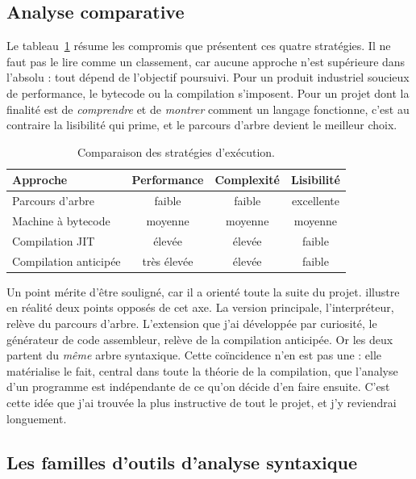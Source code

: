 \subsection{Analyse comparative}

Le tableau~\ref{tab:approches} résume les compromis que présentent ces quatre
stratégies. Il ne faut pas le lire comme un classement, car aucune approche n'est
supérieure dans l'absolu : tout dépend de l'objectif poursuivi. Pour un produit
industriel soucieux de performance, le bytecode ou la compilation s'imposent. Pour
un projet dont la finalité est de \emph{comprendre} et de \emph{montrer} comment
un langage fonctionne, c'est au contraire la lisibilité qui prime, et le parcours
d'arbre devient le meilleur choix.

\begin{table}[ht]
\centering
\caption{Comparaison des stratégies d'exécution.}
\label{tab:approches}
\begin{tabular}{@{}lccc@{}}
\toprule
\textbf{Approche} & \textbf{Performance} & \textbf{Complexité} & \textbf{Lisibilité} \\
\midrule
Parcours d'arbre        & faible      & faible   & excellente \\
Machine à bytecode      & moyenne     & moyenne  & moyenne \\
Compilation JIT         & élevée      & élevée   & faible \\
Compilation anticipée   & très élevée & élevée   & faible \\
\bottomrule
\end{tabular}
\end{table}

Un point mérite d'être souligné, car il a orienté toute la suite du projet.
\ilang{} illustre en réalité deux points opposés de cet axe. La version
principale, l'interpréteur, relève du parcours d'arbre. L'extension que j'ai
développée par curiosité, le générateur de code assembleur, relève de la
compilation anticipée. Or les deux partent du \emph{même} arbre syntaxique. Cette
coïncidence n'en est pas une : elle matérialise le fait, central dans toute la
théorie de la compilation, que l'analyse d'un programme est indépendante de ce
qu'on décide d'en faire ensuite. C'est cette idée que j'ai trouvée la plus
instructive de tout le projet, et j'y reviendrai longuement.

\subsection{Les familles d'outils d'analyse syntaxique}

